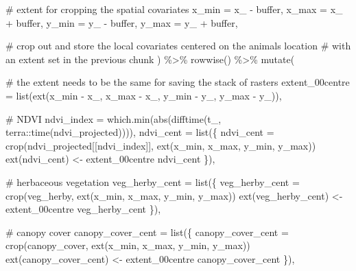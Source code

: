\documentclass[
  letterpaper,
  DIV=11,
  numbers=noendperiod]{scrartcl}
\newenvironment{Shaded}{\begin{snugshade}}{\end{snugshade}}
\newcommand{\AttributeTok}[1]{\textcolor[rgb]{0.40,0.45,0.13}{#1}}
\newcommand{\CommentTok}[1]{\textcolor[rgb]{0.37,0.37,0.37}{#1}}
\newcommand{\FunctionTok}[1]{\textcolor[rgb]{0.28,0.35,0.67}{#1}}
\newcommand{\NormalTok}[1]{\textcolor[rgb]{0.00,0.23,0.31}{#1}}
\newcommand{\OtherTok}[1]{\textcolor[rgb]{0.00,0.23,0.31}{#1}}
\newcommand{\SpecialCharTok}[1]{\textcolor[rgb]{0.37,0.37,0.37}{#1}}
\begin{document}
\begin{Shaded}
\begin{Highlighting}[]
    \CommentTok{\# extent for cropping the spatial covariates}
    \AttributeTok{x\_min =}\NormalTok{ x\_ }\SpecialCharTok{{-}}\NormalTok{ buffer,}
    \AttributeTok{x\_max =}\NormalTok{ x\_ }\SpecialCharTok{+}\NormalTok{ buffer,}
    \AttributeTok{y\_min =}\NormalTok{ y\_ }\SpecialCharTok{{-}}\NormalTok{ buffer,}
    \AttributeTok{y\_max =}\NormalTok{ y\_ }\SpecialCharTok{+}\NormalTok{ buffer,}
    
  
    \CommentTok{\# crop out and store the local covariates centered on the animal\textquotesingle{}s location }
    \CommentTok{\# with an extent set in the previous chunk}
\NormalTok{  ) }\SpecialCharTok{\%\textgreater{}\%} \FunctionTok{rowwise}\NormalTok{() }\SpecialCharTok{\%\textgreater{}\%} \FunctionTok{mutate}\NormalTok{(}

    \CommentTok{\# the extent needs to be the same for saving the stack of rasters}
    \AttributeTok{extent\_00centre =} \FunctionTok{list}\NormalTok{(}\FunctionTok{ext}\NormalTok{(x\_min }\SpecialCharTok{{-}}\NormalTok{ x\_, x\_max }\SpecialCharTok{{-}}\NormalTok{ x\_, y\_min }\SpecialCharTok{{-}}\NormalTok{ y\_, y\_max }\SpecialCharTok{{-}}\NormalTok{ y\_)),}

    \CommentTok{\# NDVI}
    \AttributeTok{ndvi\_index =} \FunctionTok{which.min}\NormalTok{(}\FunctionTok{abs}\NormalTok{(}\FunctionTok{difftime}\NormalTok{(t\_, terra}\SpecialCharTok{::}\FunctionTok{time}\NormalTok{(ndvi\_projected)))),}
    \AttributeTok{ndvi\_cent =} \FunctionTok{list}\NormalTok{(\{}
\NormalTok{      ndvi\_cent }\OtherTok{=} \FunctionTok{crop}\NormalTok{(ndvi\_projected[[ndvi\_index]], }\FunctionTok{ext}\NormalTok{(x\_min, x\_max, y\_min, y\_max))}
      \FunctionTok{ext}\NormalTok{(ndvi\_cent) }\OtherTok{\textless{}{-}}\NormalTok{ extent\_00centre}
\NormalTok{      ndvi\_cent}
\NormalTok{      \}),}

    \CommentTok{\# herbaceous vegetation}
    \AttributeTok{veg\_herby\_cent =} \FunctionTok{list}\NormalTok{(\{}
\NormalTok{      veg\_herby\_cent }\OtherTok{=} \FunctionTok{crop}\NormalTok{(veg\_herby, }\FunctionTok{ext}\NormalTok{(x\_min, x\_max, y\_min, y\_max))}
      \FunctionTok{ext}\NormalTok{(veg\_herby\_cent) }\OtherTok{\textless{}{-}}\NormalTok{ extent\_00centre}
\NormalTok{      veg\_herby\_cent}
\NormalTok{      \}),}

    \CommentTok{\# canopy cover}
    \AttributeTok{canopy\_cover\_cent =} \FunctionTok{list}\NormalTok{(\{}
\NormalTok{      canopy\_cover\_cent }\OtherTok{=} \FunctionTok{crop}\NormalTok{(canopy\_cover, }\FunctionTok{ext}\NormalTok{(x\_min, x\_max, y\_min, y\_max))}
      \FunctionTok{ext}\NormalTok{(canopy\_cover\_cent) }\OtherTok{\textless{}{-}}\NormalTok{ extent\_00centre}
\NormalTok{      canopy\_cover\_cent}
\NormalTok{      \}),}


\end{Highlighting}
\end{Shaded}
\end{document}

